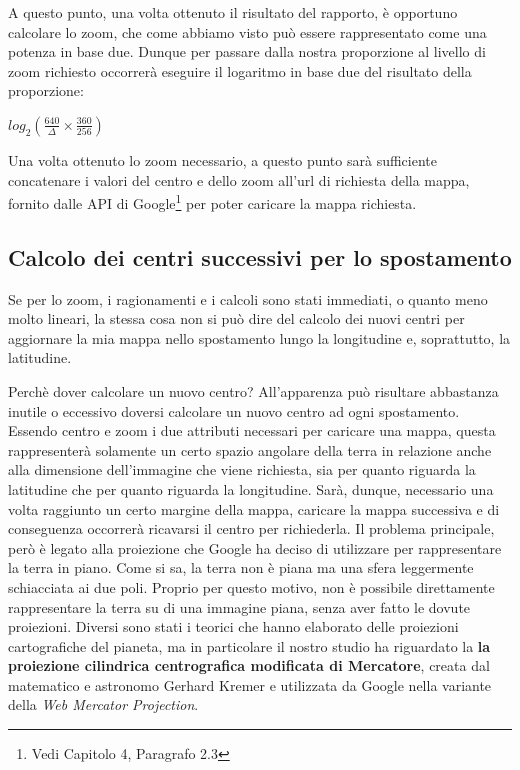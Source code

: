 A questo punto, una volta ottenuto il risultato del rapporto, è opportuno calcolare lo zoom, che come abbiamo visto può essere rappresentato come una potenza in base due. Dunque per passare dalla nostra proporzione al livello di zoom richiesto occorrerà eseguire il logaritmo in base due del risultato della proporzione:
\begin{center}

	\Large$log_{2}(\frac{640}{\Delta}\times\frac{360}{256}) $\par

\end{center}

Una volta ottenuto lo zoom necessario, a questo punto sarà sufficiente concatenare i valori del centro e dello zoom all'url di richiesta della mappa, fornito dalle API di Google\footnote{Vedi Capitolo 4, Paragrafo 2.3} per poter caricare la mappa richiesta.

\subsection{Calcolo dei centri successivi per lo spostamento}
Se per lo zoom, i ragionamenti e i calcoli sono stati immediati, o quanto meno molto lineari, la stessa cosa non si può dire del calcolo dei nuovi centri per aggiornare la mia mappa nello spostamento lungo la longitudine e, soprattutto, la latitudine.

Perchè dover calcolare un nuovo centro? All'apparenza può risultare abbastanza inutile o eccessivo doversi calcolare un nuovo centro ad ogni spostamento. Essendo centro e zoom i due attributi necessari per caricare una mappa, questa rappresenterà solamente un certo spazio angolare della terra in relazione anche alla dimensione dell'immagine che viene richiesta, sia per quanto riguarda la latitudine che per quanto riguarda la longitudine. Sarà, dunque, necessario una volta raggiunto un certo margine della mappa, caricare la mappa successiva e di conseguenza occorrerà ricavarsi il centro per richiederla. Il problema principale, però è legato alla proiezione che Google ha deciso di utilizzare per rappresentare la terra in piano. Come si sa, la terra non è piana ma una sfera leggermente schiacciata ai due poli. Proprio per questo motivo, non è possibile direttamente rappresentare la terra su di una immagine piana, senza aver fatto le dovute proiezioni. Diversi sono stati i teorici che hanno elaborato delle proiezioni cartografiche del pianeta, ma in particolare il nostro studio ha riguardato la \textbf{la proiezione cilindrica centrografica modificata di Mercatore}, creata dal matematico e astronomo Gerhard Kremer e utilizzata da Google nella variante della \textit{Web Mercator Projection}.

